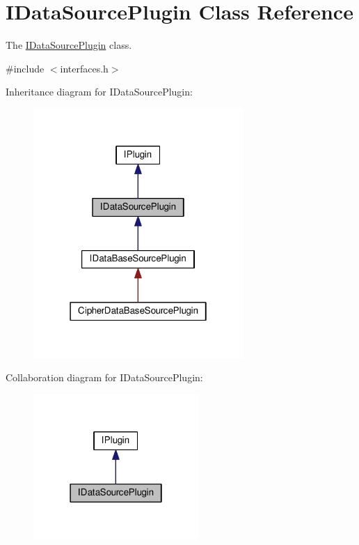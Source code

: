 \hypertarget{class_i_data_source_plugin}{}\section{I\+Data\+Source\+Plugin Class Reference}
\label{class_i_data_source_plugin}


The \hyperlink{class_i_data_source_plugin}{I\+Data\+Source\+Plugin} class.  




{\ttfamily \#include $<$interfaces.\+h$>$}



Inheritance diagram for I\+Data\+Source\+Plugin\+:\nopagebreak
\begin{figure}[H]
\begin{center}
\leavevmode
\includegraphics[width=226pt]{class_i_data_source_plugin__inherit__graph}
\end{center}
\end{figure}


Collaboration diagram for I\+Data\+Source\+Plugin\+:\nopagebreak
\begin{figure}[H]
\begin{center}
\leavevmode
\includegraphics[width=178pt]{class_i_data_source_plugin__coll__graph}
\end{center}
\end{figure}
